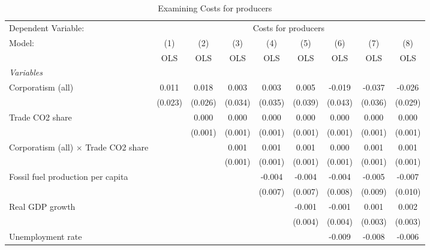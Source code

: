 
\begin{table}[htbp]
   \caption{Examining Costs for producers}
   \centering
   \begin{tabular}{lcccccccc}
      \toprule
      Dependent Variable: & \multicolumn{8}{c}{Costs for producers}\\
      Model:                                      & (1)     & (2)     & (3)     & (4)     & (5)     & (6)     & (7)     & (8)\\  
                                                  &  OLS    & OLS     & OLS     & OLS     & OLS     & OLS     & OLS     & OLS\\  
      \midrule
      \emph{Variables}\\
      Corporatism (all)                           & 0.011   & 0.018   & 0.003   & 0.003   & 0.005   & -0.019  & -0.037  & -0.026\\   
                                                  & (0.023) & (0.026) & (0.034) & (0.035) & (0.039) & (0.043) & (0.036) & (0.029)\\   
      Trade CO2 share                             &         & 0.000   & 0.000   & 0.000   & 0.000   & 0.000   & 0.000   & 0.000\\   
                                                  &         & (0.001) & (0.001) & (0.001) & (0.001) & (0.001) & (0.001) & (0.001)\\   
      Corporatism (all) $\times$ Trade CO2 share  &         &         & 0.001   & 0.001   & 0.001   & 0.000   & 0.001   & 0.001\\   
                                                  &         &         & (0.001) & (0.001) & (0.001) & (0.001) & (0.001) & (0.001)\\   
      Fossil fuel production per capita           &         &         &         & -0.004  & -0.004  & -0.004  & -0.005  & -0.007\\   
                                                  &         &         &         & (0.007) & (0.007) & (0.008) & (0.009) & (0.010)\\   
      Real GDP growth                             &         &         &         &         & -0.001  & -0.001  & 0.001   & 0.002\\   
                                                  &         &         &         &         & (0.004) & (0.004) & (0.003) & (0.003)\\   
      Unemployment rate                           &         &         &         &         &         & -0.009  & -0.008  & -0.006\\   

\end{tabular}
\end{table}
